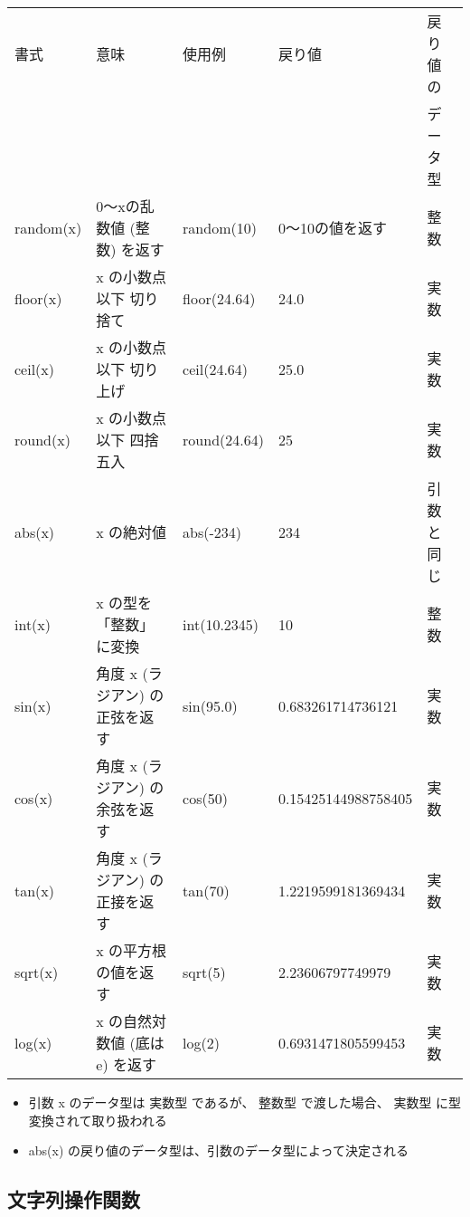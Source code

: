 \documentclass[11pt,a4j]{jarticle}
\begin{document}
\begin{table}[htbp]
  \begin{center}
    \begin{tabular}{l|p{5.0cm}|l|l|l} \hline
    書式	& 意味	& 使用例	& 戻り値	& 戻り値の\\
 & & & & データ型	\\ \hline
    random(x)	& 0〜xの乱数値 (整数) を返す		& random(10)		& 0〜10の値を返す		& 整数		\\ \hline
    floor(x)	& x の小数点以下 切り捨て			& floor(24.64)		& 24.0					& 実数		\\ \hline
    ceil(x)		& x の小数点以下 切り上げ			& ceil(24.64)		& 25.0					& 実数		\\ \hline
    round(x)	& x の小数点以下 四捨五入			& round(24.64)		& 25					& 実数		\\ \hline
    abs(x)		& x の絶対値						& abs(-234)			& 234					& 引数と同じ	\\ \hline
    int(x)		& x の型を「整数」に変換			& int(10.2345)		& 10					& 整数		\\ \hline
    sin(x)		& 角度 x (ラジアン) の正弦を返す	& sin(95.0)			& 0.683261714736121		& 実数		\\ \hline
    cos(x)		& 角度 x (ラジアン) の余弦を返す	& cos(50)			& 0.15425144988758405	& 実数		\\ \hline
    tan(x)		& 角度 x (ラジアン) の正接を返す	& tan(70)			& 1.2219599181369434	& 実数		\\ \hline
    sqrt(x)		& x の平方根の値を返す				& sqrt(5)			& 2.23606797749979		& 実数		\\ \hline
    log(x)		& x の自然対数値 (底は e) を返す	& log(2)			& 0.6931471805599453	& 実数		\\ \hline
    \end{tabular}
  \end{center}
  \begin{itemize}
    \itemsep 0pt  \parskip 0pt \small
    \item 引数 x のデータ型は 実数型 であるが、 整数型 で渡した場合、 実数型 に型変換されて取り扱われる
    \item abs(x) の戻り値のデータ型は、引数のデータ型によって決定される
  \end{itemize}
  \vspace{-1.0cm}
\end{table}

\newpage

\subsection{文字列操作関数}
\end{document}
